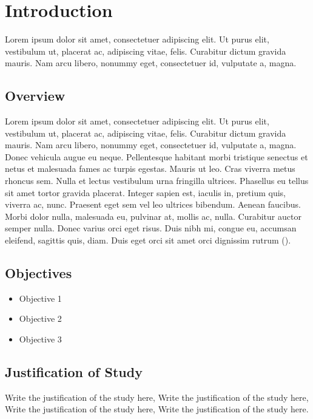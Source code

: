 \chapter{Introduction}

Lorem ipsum dolor sit amet, consectetuer adipiscing elit. Ut purus elit, vestibulum ut, placerat ac, adipiscing vitae, felis. Curabitur dictum gravida mauris. Nam arcu libero, nonummy eget, consectetuer id, vulputate a, magna. 

\section{Overview}

Lorem ipsum dolor sit amet, consectetuer adipiscing elit. Ut purus elit, vestibulum
ut, placerat ac, adipiscing vitae, felis. Curabitur dictum gravida mauris. Nam arcu libero, nonummy eget, consectetuer id, vulputate a, magna. Donec vehicula augue eu neque. Pellentesque habitant morbi tristique senectus et netus et malesuada fames ac turpis egestas. Mauris ut leo. Cras viverra metus rhoncus sem. Nulla et lectus vestibulum urna fringilla ultrices. Phasellus eu tellus sit amet tortor gravida placerat. Integer sapien est, iaculis in, pretium quis, viverra ac, nunc. Praesent eget sem vel leo ultrices bibendum. Aenean faucibus. Morbi dolor nulla, malesuada eu, pulvinar at, mollis ac, nulla. Curabitur auctor semper nulla. Donec varius orci eget risus. Duis nibh mi, congue eu, accumsan eleifend, sagittis quis, diam. Duis eget orci sit amet orci dignissim rutrum (\cite{alegro2019hybrid}).


\section{Objectives}

\begin{itemize}
	\itemsep -0.5em
	\item Objective 1 
	\item Objective 2
	\item Objective 3
\end{itemize}

\section{Justification of Study}

Write the justification of the study here, Write the justification of the study here, Write the justification of the study here, Write the justification of the study here. \\


